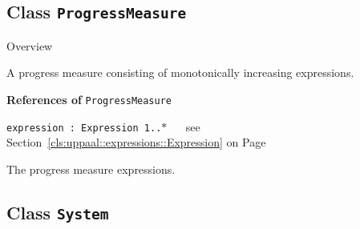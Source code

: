 \subsection{Class \bfseries \texttt{ProgressMeasure}\normalfont}
\label{cls:uppaal::declarations::system::ProgressMeasure} 
	
	\begin{longdescription}
		\item[Overview] 		
				

	

		A progress measure consisting of monotonically increasing expressions.		
		
	
			\item[\textbf{References of} \texttt{ProgressMeasure}] ~
			\begin{longdescription}
	\item[\texttt{expression : Expression 	\symbol{"5B}1..$*$\symbol{"5D}
}] ~
	see Section~\ref{cls:uppaal::expressions::Expression} on Page~\pageref{cls:uppaal::expressions::Expression}
	
	\nopagebreak
		
				

	

		The progress measure expressions.		
			\end{longdescription}
	
	\end{longdescription}
	

\subsection{Class \bfseries \texttt{System}\normalfont}
\label{cls:uppaal::declarations::system::System} 
	
